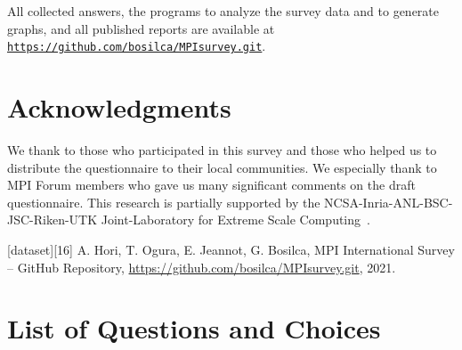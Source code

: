 \documentclass[preprint,5p,times]{elsarticle}
\begin{document}
All collected answers, the programs to analyze the survey data and to
generate graphs, and all published reports are available at
{\tt \url{https://github.com/bosilca/MPIsurvey.git}}.

\section*{Acknowledgments}

We thank to those who participated in this survey and those who
helped us to distribute the questionnaire to their local
communities. We especially thank to MPI Forum members who gave us many
significant comments on the draft questionnaire.
This research is partially supported by the
NCSA-Inria-ANL-BSC-JSC-Riken-UTK Joint-Laboratory for Extreme Scale
Computing~\cite{JLESC}.



{\noindent\footnotesize [dataset][16] A. Hori, T. Ogura, E. Jeannot, G. Bosilca, MPI
International Survey – GitHub Repository,
\url{https://github.com/bosilca/MPIsurvey.git}, 2021.}

\appendix
\section{List of Questions and Choices}
\label{app:questions}
\end{document}
